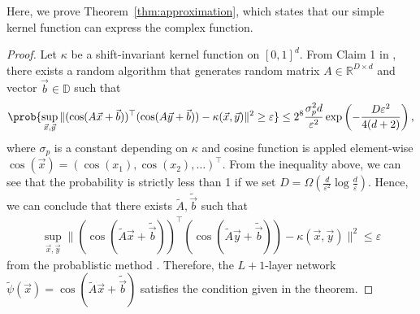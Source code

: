 Here, we prove Theorem~\ref{thm:approximation}, which states that our simple kernel function can express the complex function.

\begin{proof}
    Let $\kappa$ be a shift-invariant kernel function on $[0,1]^d$. From Claim 1 in \citet{Rahimi2008}, there exists a random algorithm that generates random matrix $A \in \mathbb{R}^{D\times d}$ and vector $\vec{b} \in \mathbb{D}$ such that
    \begin{align*}
        \prob{\sup_{\vec{x}, \vec{y}}\|(\cos(A\vec{x} + \vec{b}))^\top(\cos(A\vec{y} + \vec{b})) - \kappa(\vec{x}, \vec{y})\|^2 \geq \varepsilon} \leq 2^8 \frac{\sigma_p^2 d}{\varepsilon^2}\exp\left(-\frac{D\varepsilon^2}{4(d+2)}\right),
    \end{align*}
    where $\sigma_p$ is a constant depending on $\kappa$ and cosine function is appled element-wise $\cos(\vec{x}) = (\cos(x_1), \cos(x_2), \dots)^\top$. From the inequality above, we can see that the probability is strictly less than 1 if we set $D = \Omega(\frac{d}{\varepsilon^2}\log\frac{d}{\varepsilon})$. Hence, we can conclude that there exists $\tilde A, \tilde{\vec{b}}$ such that 
    \begin{align*}
        \sup_{\vec{x}, \vec{y}}\|(\cos(\tilde A\vec{x} + \tilde{\vec{b}}))^\top(\cos(\tilde A\vec{y} + \tilde{\vec{b}})) - \kappa(\vec{x}, \vec{y})\|^2 \leq \varepsilon
    \end{align*}
    from the probablistic method \citep{alon04}. Therefore, the $L+1$-layer network  $\tilde\psi(\vec{x}) = \cos(\tilde A\vec{x} + \tilde{\vec{b}})$ satisfies the condition given in the theorem.
\end{proof}
